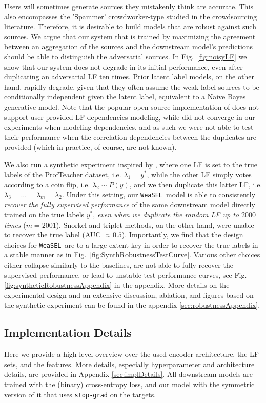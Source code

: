 \documentclass{article}
\newcommand{\weasel}{\texttt{WeaSEL}}\newcommand{\brackets}[1]{\left( #1 \right)}
\begin{document}
 Users will sometimes generate sources they mistakenly think are accurate. This also encompasses the 'Spammer' crowdworker-type studied in the crowdsourcing literature.
Therefore, it is desirable to build models that are robust against such sources.
We argue that our system that is trained by maximizing the agreement between an aggregation of the sources and the downstream model's predictions should be able to distinguish the adversarial sources.
In Fig.~\ref{fig:noisyLF} we show that our system does not degrade in its initial performance, even after duplicating an adversarial LF ten times.
Prior latent label models, on the other hand, rapidly degrade, given that they often assume the weak label sources to be conditionally independent given the latent label, equivalent to a Naive Bayes generative model.
Note that the popular open-source implementation of \cite{Snorkel, Multitask}
does not support user-provided LF dependencies modeling, while \cite{triplets, TripletsMean} did not converge in our experiments when modeling dependencies, and as such we were not able to test their performance when the correlation dependencies between the duplicates are provided (which in practice, of course, are not known).

We also run a synthetic experiment inspired by \cite{MaxMIG}, where one LF is set to the true labels of the ProfTeacher dataset, i.e. $\lambda_1 = y^*$, while the other LF simply votes according to a coin flip, i.e. $\lambda_2 \sim P(y)$, and we then duplicate this latter LF, i.e. $\lambda_3 = \dots = \lambda_m=\lambda_2$. Under this setting, our \weasel\ model is able to consistently \emph{recover the fully supervised performance} of the same downstream model directly trained on the true labels $y^*$, \emph{even when we duplicate the random LF up to $2000$ times} ($m=2001$). 
Snorkel and triplet methods, on the other hand, were unable to recover the true label (AUC $\approx0.5$).
Importantly, we find that the design choices for \weasel\ are to a large extent key in order to recover the true labels in a stable manner as in Fig.~\ref{fig:SynthRobustnessTestCurve}. Various other choices either collapse similarly to the baselines, are not able to fully recover the supervised performance, or lead to unstable test performance curves, see Fig. \ref{fig:syntheticRobustnessAppendix} in the appendix. 
More details on the experimental design and an extensive discussion, ablation, and figures based on the synthetic experiment can be found in the appendix \ref{sec:robustnessAppendix}.

\subsection{Implementation Details}
Here we provide a high-level overview over the used encoder architecture, the LF sets, and the features. More details, especially hyperparameter and architecture details, are provided in Appendix \ref{sec:implDetails}. All downstream models are trained with the (binary) cross-entropy loss, and our model with the symmetric version of it that uses \texttt{stop-grad} on the targets.
\end{document}
